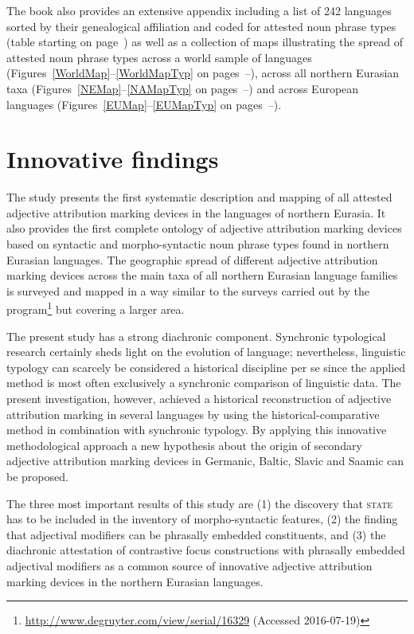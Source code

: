 \noindent The book also provides an extensive appendix including a list of 242 languages sorted by their genealogical affiliation and coded for attested noun phrase types (table starting on page~\pageref{sample1}) as well as a collection of maps illustrating the spread of attested noun phrase types across a world sample of languages (Figures~\ref{WorldMap}–\ref{WorldMapTyp} on pages~\pageref{WorldMap}–\pageref{WorldMapTyp}), across all northern Eurasian taxa (Figures~\ref{NEMap}–\ref{NAMapTyp} on pages~\pageref{NEMap}–\pageref{NAMapTyp}) and across European languages (Figures~\ref{EUMap}–\ref{EUMapTyp} on pages~\pageref{EUMap}–\pageref{EUMapTyp}).

\section{Innovative findings}
The study presents the first systematic description and mapping of all attested adjective attribution marking devices in the languages of northern Eurasia. It also provides the first complete ontology of adjective attribution marking devices based on syntactic and morpho-syntactic noun phrase types found in northern Eurasian languages. The geographic spread of different adjective attribution marking devices across the main taxa of all northern Eurasian language families is surveyed and mapped in a way similar to the surveys carried out by the  program\footnote{\url{http://www.degruyter.com/view/serial/16329} (Accessed 2016-07-19)} but covering a larger area.

The present study has a strong diachronic component. Synchronic typological research certainly sheds light on the evolution of language; nevertheless, linguistic typology can scarcely be considered a historical discipline per se since the applied method is most often exclusively a synchronic comparison of linguistic data. The present investigation, however, achieved a historical reconstruction of adjective attribution marking in several languages by using the historical-comparative method in combination with synchronic typology. By applying this innovative methodological approach a new hypothesis about the origin of secondary adjective attribution marking devices in Germanic, Baltic, Slavic and Saamic can be proposed. 

The three most important results of this study are (1) the discovery that \textsc{state} has to be included in the inventory of morpho-syntactic features, (2) the finding that adjectival modifiers can be phrasally embedded constituents, and (3) the diachronic attestation of contrastive focus constructions with phrasally embedded adjectival modifiers as a common source of innovative adjective attribution marking devices in the northern Eurasian languages.

